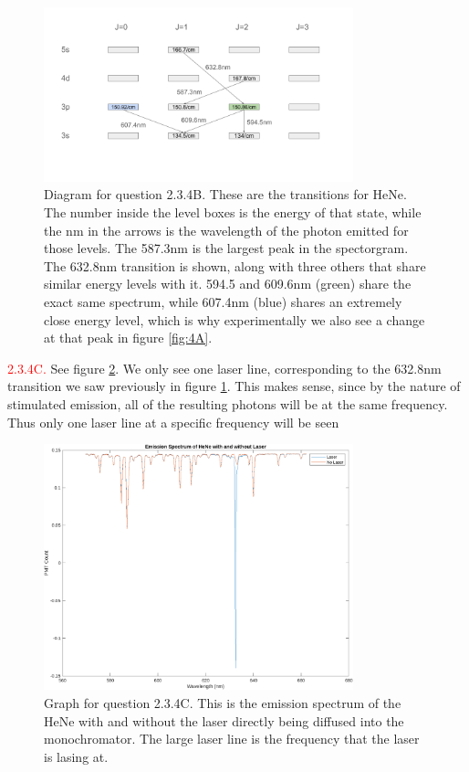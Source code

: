 \documentclass[letterpaper, reqno,11pt]{article}
\begin{document}
\begin{figure}[tb]
    \centering
    \includegraphics[width=0.8\textwidth]{4B}
    \caption{Diagram for question 2.3.4B. These are the transitions for HeNe. The number inside the level boxes is the energy of that state, while the nm in the arrows is the wavelength of the photon emitted for those levels. The 587.3nm is the largest peak in the spectorgram. The 632.8nm transition is shown, along with three others that share similar energy levels with it. 594.5 and 609.6nm (green) share the exact same spectrum, while 607.4nm (blue) shares an extremely close energy level, which is why experimentally we also see a change at that peak in figure \ref{fig:4A}.}
    \label{fig:4B}
\end{figure}

\noindent \textcolor{red}{2.3.4C.} See figure \ref{fig:4C}. We only see one laser line, corresponding to the 632.8nm transition we saw previously in figure \ref{fig:4B}. This makes sense, since by the nature of stimulated emission, all of the resulting photons will be at the same frequency. Thus only one laser line at a specific frequency will be seen

\begin{figure}[tb]
    \centering
    \includegraphics[width=0.8\textwidth]{4C}
    \caption{Graph for question 2.3.4C. This is the emission spectrum of the HeNe with and without the laser directly being diffused into the monochromator. The large laser line is the frequency that the laser is lasing at.}
    \label{fig:4C}
\end{figure}
\end{document}
